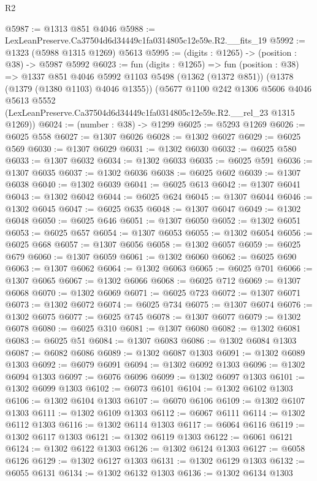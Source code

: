 \begin{lexlean}{R2}
\begin{coremodule}
@5987 := @1313 @851 @4046
@5988 := LexLeanPreserve.Ca37504d6d34449c1fa0314805c12e59e.R2.__fits_19
@5992 := @1323 (@5988 @1315 @1269) @5613
@5995 := (digits : @1265) -> (position : @38) -> @5987 @5992
@6023 := fun (digits : @1265) =>
  fun (position : @38) =>
  @1337
    @851
    @4046
    @5992
    @1103
    @5498
    (@1362 (@1372 @851))
    (@1378 (@1379 (@1380 @1103) @4046 @1355))
    (@5677
      @1100
      @242
      @1306
      @5606
      @4046
      @5613
      @5552
      (LexLeanPreserve.Ca37504d6d34449c1fa0314805c12e59e.R2.__rel_23 @1315 @1269))
@6024 := (number : @38) -> @1299
@6025 := @5293 @1269
@6026 := @6025 @558
@6027 := @1307 @6026
@6028 := @1302 @6027
@6029 := @6025 @569
@6030 := @1307 @6029
@6031 := @1302 @6030
@6032 := @6025 @580
@6033 := @1307 @6032
@6034 := @1302 @6033
@6035 := @6025 @591
@6036 := @1307 @6035
@6037 := @1302 @6036
@6038 := @6025 @602
@6039 := @1307 @6038
@6040 := @1302 @6039
@6041 := @6025 @613
@6042 := @1307 @6041
@6043 := @1302 @6042
@6044 := @6025 @624
@6045 := @1307 @6044
@6046 := @1302 @6045
@6047 := @6025 @635
@6048 := @1307 @6047
@6049 := @1302 @6048
@6050 := @6025 @646
@6051 := @1307 @6050
@6052 := @1302 @6051
@6053 := @6025 @657
@6054 := @1307 @6053
@6055 := @1302 @6054
@6056 := @6025 @668
@6057 := @1307 @6056
@6058 := @1302 @6057
@6059 := @6025 @679
@6060 := @1307 @6059
@6061 := @1302 @6060
@6062 := @6025 @690
@6063 := @1307 @6062
@6064 := @1302 @6063
@6065 := @6025 @701
@6066 := @1307 @6065
@6067 := @1302 @6066
@6068 := @6025 @712
@6069 := @1307 @6068
@6070 := @1302 @6069
@6071 := @6025 @723
@6072 := @1307 @6071
@6073 := @1302 @6072
@6074 := @6025 @734
@6075 := @1307 @6074
@6076 := @1302 @6075
@6077 := @6025 @745
@6078 := @1307 @6077
@6079 := @1302 @6078
@6080 := @6025 @310
@6081 := @1307 @6080
@6082 := @1302 @6081
@6083 := @6025 @51
@6084 := @1307 @6083
@6086 := @1302 @6084 @1303
@6087 := @6082 @6086
@6089 := @1302 @6087 @1303
@6091 := @1302 @6089 @1303
@6092 := @6079 @6091
@6094 := @1302 @6092 @1303
@6096 := @1302 @6094 @1303
@6097 := @6076 @6096
@6099 := @1302 @6097 @1303
@6101 := @1302 @6099 @1303
@6102 := @6073 @6101
@6104 := @1302 @6102 @1303
@6106 := @1302 @6104 @1303
@6107 := @6070 @6106
@6109 := @1302 @6107 @1303
@6111 := @1302 @6109 @1303
@6112 := @6067 @6111
@6114 := @1302 @6112 @1303
@6116 := @1302 @6114 @1303
@6117 := @6064 @6116
@6119 := @1302 @6117 @1303
@6121 := @1302 @6119 @1303
@6122 := @6061 @6121
@6124 := @1302 @6122 @1303
@6126 := @1302 @6124 @1303
@6127 := @6058 @6126
@6129 := @1302 @6127 @1303
@6131 := @1302 @6129 @1303
@6132 := @6055 @6131
@6134 := @1302 @6132 @1303
@6136 := @1302 @6134 @1303

\end{coremodule}
\end{lexlean}
